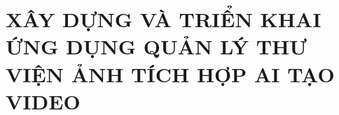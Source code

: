 \chapter{XÂY DỰNG VÀ TRIỂN KHAI ỨNG DỤNG QUẢN LÝ THƯ VIỆN ẢNH
TÍCH HỢP AI TẠO VIDEO}
\label{chap:experiment}





